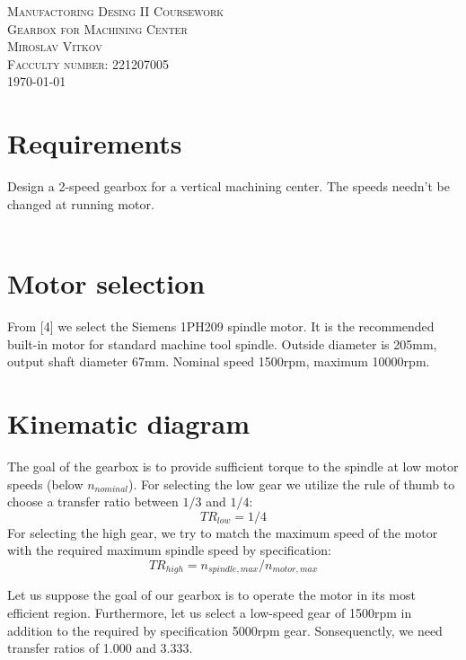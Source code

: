 \documentclass{article}
\begin{document}
\begin{titlepage}
\begin{center}
\textsc{\Large Manufactoring Desing II Coursework}\\[1cm]
\textsc{\Huge Gearbox for Machining Center}\\[1.5cm]
\textsc{\Large Miroslav Vitkov}\\[0.5cm]
\textsc{Facculty number: 221207005}\\[1.5cm]
\vfill
\today
\end{center}
\end{titlepage}

\section{Requirements}
Design a 2-speed gearbox for a vertical machining center.
The speeds needn't be changed at running motor. \\
          \\


\section{Motor selection}
From [4] we select the Siemens 1PH209 spindle motor.
It is the recommended built-in motor for standard machine tool spindle.
Outside diameter is 205mm, output shaft diameter 67mm.
Nominal speed 1500rpm, maximum 10000rpm.

\section{Kinematic diagram} %
The goal of the gearbox is to provide sufficient torque to the spindle at low motor speeds (below $n_{nominal}$).
For selecting the low gear we utilize the rule of thumb to choose a transfer ratio between $1/3$ and $1/4$:
$$ TR_{low} = 1/4 $$
For selecting the high gear, we try to match the maximum speed of the motor with the required maximum spindle speed by specification:
$$ TR_{high} = n_{spindle, max} / n_{motor, max} $$

Let us suppose the goal of our gearbox is to operate the motor in its most efficient region.
Furthermore, let us select a low-speed gear of 1500rpm in addition to the required by specification 5000rpm gear.
Sonsequenctly, we need transfer ratios of 1.000 and 3.333.
\end{document}
